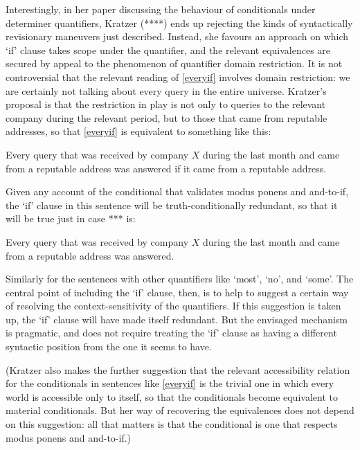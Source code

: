 \documentclass[If.tex]{subfiles}
\begin{document}
Interestingly, in her paper discussing the behaviour of conditionals under determiner quantifiers, Kratzer (****) ends up rejecting the kinds of syntactically revisionary maneuvers just described.   Instead, she favours an approach on which ‘if’ clause takes scope under the quantifier, and the relevant equivalences are secured by appeal to the phenomenon of quantifier domain restriction.  It is not controversial that the relevant reading of \ref{everyif} involves domain restriction: we are certainly not talking about every query in the entire universe.  Kratzer's proposal is that the restriction in play is not only to queries to the relevant company during the relevant period, but to those that came from reputable addresses, so that \ref{everyif} is equivalent to something like this:
\begin{prop}
\nitem 
	Every query that was received by company $X$ during the last month and came from a reputable address was answered if it came from a reputable address.
\end{prop}
Given any account of the conditional that validates modus ponens and and-to-if, the ‘if’ clause in this sentence will be truth-conditionally redundant, so that it will be true just in case *** is:
\begin{prop}
\nitem 
	Every query that was received by company $X$ during the last month and came from a reputable address was answered.  
\end{prop}
Similarly for the sentences with other quantifiers like ‘most’, ‘no’, and ‘some’.  The central point of including the ‘if’ clause, then, is to help to suggest a certain way of resolving the context-sensitivity of the quantifiers.  If this suggestion is taken up, the ‘if’ clause will have made itself redundant.  But the envisaged mechanism is pragmatic, and does not require treating the ‘if’ clause as having a different syntactic position from the one it seems to have.  

(Kratzer also makes the further suggestion that the relevant accessibility relation for the conditionals in sentences like \ref{everyif} is the trivial one in which every world is accessible only to itself, so that the conditionals become equivalent to material conditionals. But her way of recovering the equivalences does not depend on this suggestion: all that matters is that the conditional is one that respects modus ponens and and-to-if.)
\end{document}
